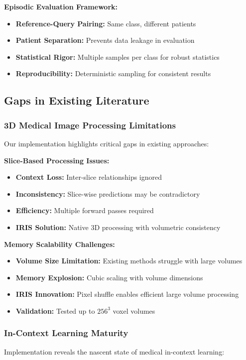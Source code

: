 \textbf{Episodic Evaluation Framework:}
\begin{itemize}
    \item \textbf{Reference-Query Pairing:} Same class, different patients
    \item \textbf{Patient Separation:} Prevents data leakage in evaluation
    \item \textbf{Statistical Rigor:} Multiple samples per class for robust statistics
    \item \textbf{Reproducibility:} Deterministic sampling for consistent results
\end{itemize}

\subsection*{Gaps in Existing Literature}

\subsubsection*{3D Medical Image Processing Limitations}
Our implementation highlights critical gaps in existing approaches:

\textbf{Slice-Based Processing Issues:}
\begin{itemize}
    \item \textbf{Context Loss:} Inter-slice relationships ignored
    \item \textbf{Inconsistency:} Slice-wise predictions may be contradictory
    \item \textbf{Efficiency:} Multiple forward passes required
    \item \textbf{IRIS Solution:} Native 3D processing with volumetric consistency
\end{itemize}

\textbf{Memory Scalability Challenges:}
\begin{itemize}
    \item \textbf{Volume Size Limitation:} Existing methods struggle with large volumes
    \item \textbf{Memory Explosion:} Cubic scaling with volume dimensions
    \item \textbf{IRIS Innovation:} Pixel shuffle enables efficient large volume processing
    \item \textbf{Validation:} Tested up to $256^3$ voxel volumes
\end{itemize}

\subsubsection*{In-Context Learning Maturity}
Implementation reveals the nascent state of medical in-context learning:

